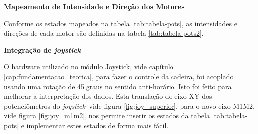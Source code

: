   \textbf{Mapeamento de Intensidade e Direção dos Motores}

    Conforme os estados mapeados na tabela \ref{tab:tabela-pots}, as intensidades e direções de cada motor são definidas na tabela \ref{tab:tabela-pots2}.

    \begin{table}[!ht]
    \centering
    \caption{Intensidade e direção dos motores conforme estado. Asteriscos simbolizam motor sem direção}
    \label{tab:tabela-pots2}
    \end{table}

    \textbf{Integração de \textit{joystick}}

    O hardware utilizado no módulo Joystick, vide capítulo \ref{cap:fundamentacao_teorica}, para fazer o controle da cadeira, foi acoplado usando uma rotação de 45 graus no sentido anti-horário. Isto foi feito para melhorar a interpretação dos dados. Esta translação do eixo XY dos potenciômetros do \textit{joystick}, vide figura \ref{fig:joy_superior}, para o novo eixo M1M2, vide figura \ref{fig:joy_m1m2}, nos permite inserir os estados da tabela \ref{tab:tabela-pots} e implementar estes estados de forma mais fácil.

